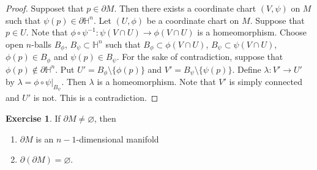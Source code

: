 \documentclass[12pt]{amsart}
\theoremstyle{definition}
\theoremstyle{remark}
\theoremstyle{definition}
\newtheorem{ex}[definition]{Exercise}
\newcommand{\lam}{\lambda}
\renewcommand{\H}{\mathbb{H}}
\begin{document}
	\begin{proof}
		Supposet that $p \in \partial M$. Then there exists a coordinate chart $(V, \psi)$ on $M$ such that $\psi(p) \in \partial \H^n$. Let $(U, \phi)$ be a coordinate chart on $M$. Suppose that $p \in U$. Note that $\phi \circ \psi^{-1} : \psi(V \cap U) \rightarrow \phi(V \cap U)$ is a homeomorphism. Choose open $n$-balls $B_{\phi}$, $B_{\psi} \subset \H^n$ such that $B_{\phi} \subset \phi(V \cap U)$, $B_{\psi} \subset \psi(V \cap U)$, $\phi(p) \in B_{\phi}$ and $\psi(p) \in B_{\psi}$. For the sake of contradiction, suppose that $\phi(p) \not \in \partial \H^n$. Put $ U' = B_{\phi} \setminus \{\phi(p)\}$ and $V' = B_{\psi} \setminus \{\psi(p)\}$. Define $\lam: V' \rightarrow U'$ by $\lam = \phi \circ \psi|_{B_{\psi}}$. Then $\lam$ is a homeomorphism. Note that $V'$ is simply connected and $U'$ is not. This is a contradiction. 
	\end{proof}

	\begin{ex}
		If $\partial M \neq \varnothing$, then 
		\begin{enumerate}
			\item $\partial M$ is an $n-1$-dimensional manifold \item $\partial (\partial M) = \varnothing$.
		\end{enumerate}
	\end{ex}
\end{document}
